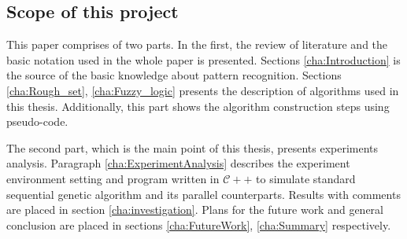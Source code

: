 \subsection{Scope of this project}
This paper comprises of two parts. In the first, the review of
literature and the basic notation used in the whole paper is presented. Sections
\ref{cha:Introduction} is the source of the basic
knowledge about pattern recognition. Sections \ref{cha:Rough_set}, \ref{cha:Fuzzy_logic}
presents the description of algorithms used in this thesis. Additionally, this
part shows the algorithm construction steps using pseudo-code.

The second part, which is the main point of this thesis, presents experiments analysis.
Paragraph \ref{cha:ExperimentAnalysis} describes the experiment environment
setting and program written in $\mathcal{C++}$ to simulate standard sequential genetic
algorithm and its parallel counterparts. Results with comments are placed in
section \ref{cha:investigation}. Plans for the future work and general
conclusion are placed in sections \ref{cha:FutureWork}, \ref{cha:Summary}
respectively. 

